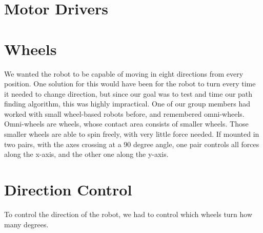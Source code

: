\begin{figure}[htp] 
    \centering
    \hfill%
\end{figure}

\section{Motor Drivers}\label{sec:drivers}
\section{Wheels}\label{sec:wheels}
We wanted the robot to be capable of moving in eight directions from every position.
One solution for this would have been for the robot to turn every time it needed to change direction,
but since our goal was to test and time our path finding algorithm,
this was highly impractical.
One of our group members had worked with small wheel-based robots before,
and remembered omni-wheels.
Omni-wheels are wheels,
whose contact area consists of smaller wheels.
Those smaller wheels are able to spin freely,
with very little force needed.
If mounted in two pairs,
with the axes crossing at a 90 degree angle, 
one pair controls all forces along the x-axis,
and the other one along the y-axis.

\section{Direction Control}\label{sec:direction}
To control the direction of the robot,
we had to control which wheels turn how many degrees.

